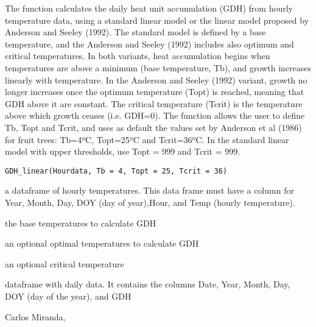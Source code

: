 \documentclass[a4paper]{book}
\begin{document}
%
\begin{Description}\relax
The function calculates the daily heat unit accumulation (GDH)
from hourly temperature data, using a standard linear model or the
linear model proposed by Anderson and Seeley (1992). The standard
model is defined by a base temperature, and the Anderson and Seeley 
(1992) includes also optimum and critical temperatures. In both
variants, heat accumulation begins when temperatures are above a 
minimum (base temperature, Tb), and growth increases linearly with 
temperature. In the Anderson and Seeley (1992) variant, growth no
longer increases once the optimum temperature (Topt) is reached, 
meaning that GDH above it are constant. The critical temperature 
(Tcrit) is the temperature above which growth ceases (i.e. GDH=0). 
The function allows the user to define Tb, Topt and Tcrit, and uses
as default the values set by Anderson et al (1986) for fruit trees: 
Tb=4ºC, Topt=25ºC and Tcrit=36ºC. In the standard linear model with
upper thresholds, use Topt = 999 and Tcrit = 999.
\end{Description}
%
\begin{Usage}
\begin{verbatim}
GDH_linear(Hourdata, Tb = 4, Topt = 25, Tcrit = 36)
\end{verbatim}
\end{Usage}
%
\begin{Arguments}
\begin{ldescription}
\item[\code{Hourdata}] a dataframe of hourly temperatures. This data frame
must have a column for Year, Month, Day, DOY (day of year),Hour, and
Temp (hourly temperature).

\item[\code{Tb}] the base temperatures to calculate GDH

\item[\code{Topt}] an optional optimal temperatures to calculate GDH

\item[\code{Tcrit}] an optional critical temperature
\end{ldescription}
\end{Arguments}
%
\begin{Value}
dataframe with daily data. It contains the columns Date,
Year, Month, Day, DOY (day of the year), and GDH
\end{Value}
%
\begin{Author}\relax
Carlos Miranda, 
\end{Author}
\end{document}

